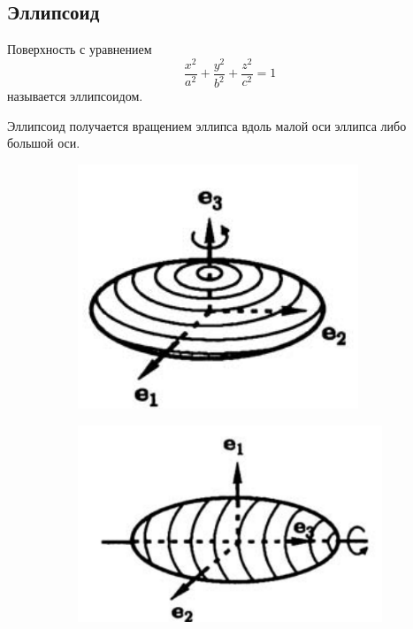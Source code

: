 \subsection*{Эллипсоид}
Поверхность с уравнением $$
  \frac{x^2}{a^2} + \frac{y^2}{b^2} + \frac{z^2}{c^2} = 1
$$ называется эллипсоидом.

Эллипсоид получается вращением эллипса вдоль малой оси эллипса либо большой оси.
\begin{figure}[H]
  \centering
  \begin{subfigure}[b]{0.4\textwidth}
    \centering
    \includegraphics[width = \textwidth]{images/second_ellipsoid_A.png}
  \end{subfigure}
  \hfill
  \begin{subfigure}[b]{0.4\textwidth}
    \centering
    \includegraphics[width = \textwidth]{images/second_ellipsoid_B.png}
  \end{subfigure}
\end{figure}


